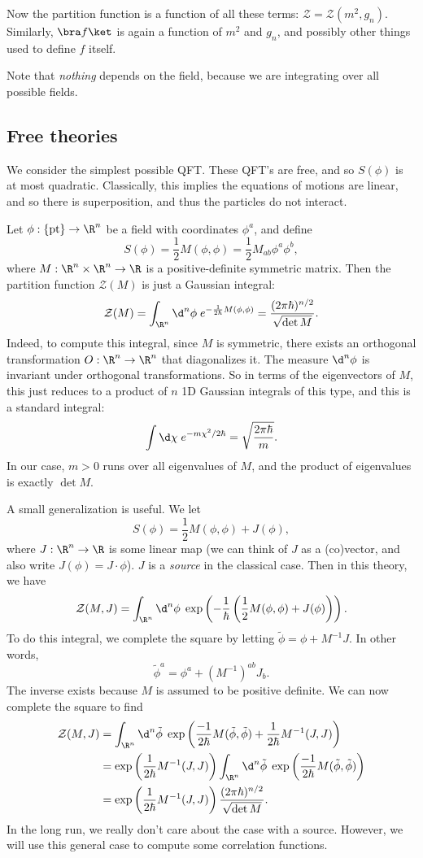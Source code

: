 \documentclass[a4paper]{article}
\begin{document}
Now the partition function is a function of all these terms: $\mathcal{Z} = \mathcal{Z}(m^2, g_n)$. Similarly, $\bra f\ket$ is again a function of $m^2$ and $g_n$, and possibly other things used to define $f$ itself.

Note that \emph{nothing} depends on the field, because we are integrating over all possible fields.

\subsection{Free theories}
We consider the simplest possible QFT. These QFT's are free, and so $S(\phi)$ is at most quadratic. Classically, this implies the equations of motions are linear, and so there is superposition, and thus the particles do not interact.

Let $\phi: \{\mathrm{pt}\} \to \R^n$ be a field with coordinates $\phi^a$, and define
\[
  S(\phi) = \frac{1}{2} M(\phi, \phi) = \frac{1}{2} M_{ab} \phi^a \phi^b,
\]
where $M: \R^n \times \R^n \to \R$ is a positive-definite symmetric matrix. Then the partition function $\mathcal{Z}(M)$ is just a Gaussian integral:
\[
  \mathcal{Z}(M) = \int_{\R^n} \d^n \phi\; e^{- \frac{1}{2\hbar} M(\phi, \phi)} = \frac{(2 \pi \hbar)^{n/2}}{\sqrt{\det{M}}}.
\]
Indeed, to compute this integral, since $M$ is symmetric, there exists an orthogonal transformation $O: \R^n \to \R^n$ that diagonalizes it. The measure $\d^n \phi$ is invariant under orthogonal transformations. So in terms of the eigenvectors of $M$, this just reduces to a product of $n$ 1D Gaussian integrals of this type, and this is a standard integral:
\[
  \int \d \chi\; e^{-m\chi^2/2\hbar} = \sqrt{\frac{2\pi \hbar}{m}}.
\]
In our case, $m > 0$ runs over all eigenvalues of $M$, and the product of eigenvalues is exactly $\det M$.

A small generalization is useful. We let
\[
  S(\phi) = \frac{1}{2} M(\phi, \phi) + J(\phi),
\]
where $J: \R^n \to \R$ is some linear map (we can think of $J$ as a (co)vector, and also write $J(\phi) = J \cdot \phi$). $J$ is a \emph{source} in the classical case. Then in this theory, we have
\[
  \mathcal{Z}(M, J) = \int_{\R^n} \d^n \phi\; \exp\left(-\frac{1}{\hbar}\left(\frac{1}{2} M(\phi, \phi) + J(\phi)\right)\right).
\]
To do this integral, we complete the square by letting $\tilde{\phi} = \phi + M^{-1}J$. In other words,
\[
  \tilde{\phi}^a = \phi^a + (M^{-1})^{ab} J_b.
\]
The inverse exists because $M$ is assumed to be positive definite. We can now complete the square to find
\begin{align*}
  \mathcal{Z}(M, J) &= \int_{\R^n} \d^n \tilde{\phi} \;\exp\left(\frac{-1}{2\hbar}M(\tilde{\phi}, \tilde{\phi}) + \frac{1}{2\hbar}M^{-1}(J, J)\right)\\
  &= \exp\left(\frac{1}{2\hbar}M^{-1}(J, J)\right)\int_{\R^n} \d^n \tilde{\phi} \;\exp\left(\frac{-1}{2\hbar}M(\tilde{\phi}, \tilde{\phi})\right)\\
  &= \exp\left(\frac{1}{2\hbar}M^{-1}(J, J)\right) \frac{(2\pi \hbar)^{n/2}}{\sqrt{\det M}}.
\end{align*}
In the long run, we really don't care about the case with a source. However, we will use this general case to compute some correlation functions.
\end{document}
